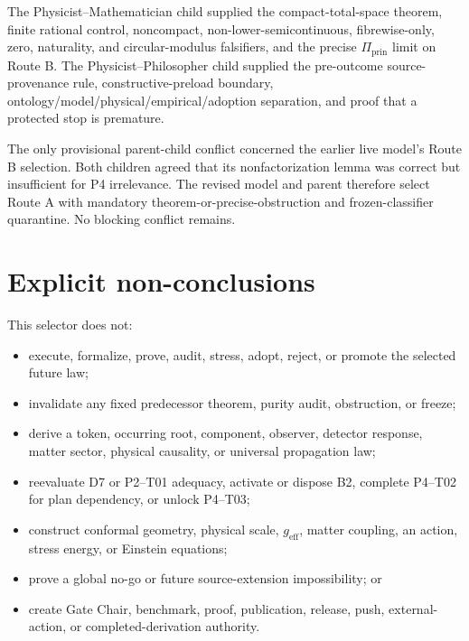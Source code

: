 \documentclass[11pt]{article}
\begin{document}
The Physicist--Mathematician child supplied the compact-total-space theorem,
finite rational control, noncompact, non-lower-semicontinuous, fibrewise-only,
zero, naturality, and circular-modulus falsifiers, and the precise
\(\Pi_{\mathrm{prin}}\) limit on Route B.  The Physicist--Philosopher child
supplied the pre-outcome source-provenance rule, constructive-preload boundary,
ontology/model/physical/empirical/adoption separation, and proof that a
protected stop is premature.

The only provisional parent-child conflict concerned the earlier live model's
Route B selection.  Both children agreed that its nonfactorization lemma was
correct but insufficient for P4 irrelevance.  The revised model and parent
therefore select Route A with mandatory theorem-or-precise-obstruction and
frozen-classifier quarantine.  No blocking conflict remains.

\section{Explicit non-conclusions}

This selector does not:
\begin{itemize}
  \item execute, formalize, prove, audit, stress, adopt, reject, or promote the
  selected future law;
  \item invalidate any fixed predecessor theorem, purity audit, obstruction,
  or freeze;
  \item derive a token, occurring root, component, observer, detector response,
  matter sector, physical causality, or universal propagation law;
  \item reevaluate D7 or P2--T01 adequacy, activate or dispose B2, complete
  P4--T02 for plan dependency, or unlock P4--T03;
  \item construct conformal geometry, physical scale, \(g_{\mathrm{eff}}\),
  matter coupling, an action, stress energy, or Einstein equations;
  \item prove a global no-go or future source-extension impossibility; or
  \item create Gate Chair, benchmark, proof, publication, release, push,
  external-action, or completed-derivation authority.
\end{itemize}
\end{document}
